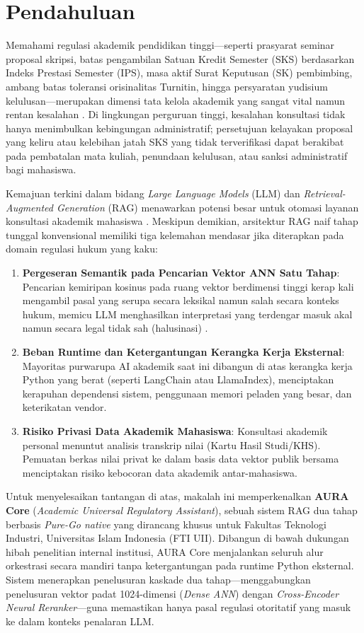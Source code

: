 \documentclass[conference]{IEEEtran}
\begin{document}
\section{Pendahuluan}
Memahami regulasi akademik pendidikan tinggi—seperti prasyarat seminar proposal skripsi, batas pengambilan Satuan Kredit Semester (SKS) berdasarkan Indeks Prestasi Semester (IPS), masa aktif Surat Keputusan (SK) pembimbing, ambang batas toleransi orisinalitas Turnitin, hingga persyaratan yudisium kelulusan—merupakan dimensi tata kelola akademik yang sangat vital namun rentan kesalahan \cite{uii2024pedoman, fti2024pedoman}. Di lingkungan perguruan tinggi, kesalahan konsultasi tidak hanya menimbulkan kebingungan administratif; persetujuan kelayakan proposal yang keliru atau kelebihan jatah SKS yang tidak terverifikasi dapat berakibat pada pembatalan mata kuliah, penundaan kelulusan, atau sanksi administratif bagi mahasiswa.

Kemajuan terkini dalam bidang \textit{Large Language Models} (LLM) dan \textit{Retrieval-Augmented Generation} (RAG) menawarkan potensi besar untuk otomasi layanan konsultasi akademik mahasiswa \cite{lewis2020retrieval, gao2023retrieval}. Meskipun demikian, arsitektur RAG naif tahap tunggal konvensional memiliki tiga kelemahan mendasar jika diterapkan pada domain regulasi hukum yang kaku:
\begin{enumerate}
    \item \textbf{Pergeseran Semantik pada Pencarian Vektor ANN Satu Tahap}: Pencarian kemiripan kosinus pada ruang vektor berdimensi tinggi kerap kali mengambil pasal yang serupa secara leksikal namun salah secara konteks hukum, memicu LLM menghasilkan interpretasi yang terdengar masuk akal namun secara legal tidak sah (halusinasi) \cite{ji2023survey, huang2023survey}.
    \item \textbf{Beban Runtime dan Ketergantungan Kerangka Kerja Eksternal}: Mayoritas purwarupa AI akademik saat ini dibangun di atas kerangka kerja Python yang berat (seperti LangChain atau LlamaIndex), menciptakan kerapuhan dependensi sistem, penggunaan memori peladen yang besar, dan keterikatan vendor.
    \item \textbf{Risiko Privasi Data Akademik Mahasiswa}: Konsultasi akademik personal menuntut analisis transkrip nilai (Kartu Hasil Studi/KHS). Pemuatan berkas nilai privat ke dalam basis data vektor publik bersama menciptakan risiko kebocoran data akademik antar-mahasiswa.
\end{enumerate}

Untuk menyelesaikan tantangan di atas, makalah ini memperkenalkan \textbf{AURA Core} (\textit{Academic Universal Regulatory Assistant}), sebuah sistem RAG dua tahap berbasis \textit{Pure-Go native} yang dirancang khusus untuk Fakultas Teknologi Industri, Universitas Islam Indonesia (FTI UII). Dibangun di bawah dukungan hibah penelitian internal institusi, AURA Core menjalankan seluruh alur orkestrasi secara mandiri tanpa ketergantungan pada runtime Python eksternal. Sistem menerapkan penelusuran kaskade dua tahap—menggabungkan penelusuran vektor padat 1024-dimensi (\textit{Dense ANN}) dengan \textit{Cross-Encoder Neural Reranker}—guna memastikan hanya pasal regulasi otoritatif yang masuk ke dalam konteks penalaran LLM.
\end{document}

